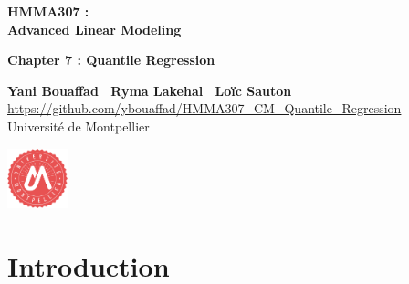 \documentclass[unknownkeysallowed]{beamer}
\begin{document}



\begin{frame}
\bigskip
\bigskip
\begin{center}{
\LARGE\color{marron}
\textbf{HMMA307 : \\ Advanced Linear Modeling}
\textbf{ }\\
\vspace{0.5cm}
}

\color{marron}
\textbf{Chapter 7 : Quantile Regression}
\end{center}

\vspace{0.5cm}

\begin{center}
\textbf{Yani Bouaffad \ Ryma Lakehal \ Loïc Sauton} \\
\vspace{0.1cm}
\url{https://github.com/ybouaffad/HMMA307_CM_Quantile_Regression}\\
\vspace{0.5cm}
Université de Montpellier \\
\end{center}

\centering
\includegraphics[width=0.13\textwidth]{Logo}

\end{frame}




\section{Introduction}
\label{sec:introdcution}
\end{document}
